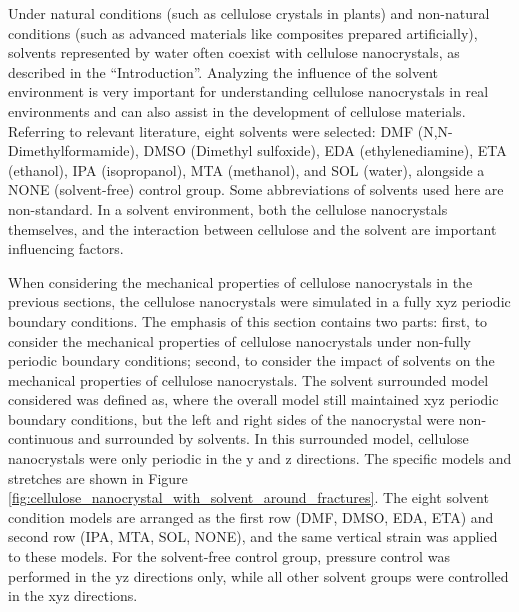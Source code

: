 \documentclass{article}
\begin{document}
Under natural conditions (such as cellulose crystals in plants) and non-natural conditions (such as advanced materials like composites prepared artificially), solvents represented by water often coexist with cellulose nanocrystals, as described in the ``Introduction''.
Analyzing the influence of the solvent environment is very important for understanding cellulose nanocrystals in real environments and can also assist in the development of cellulose materials.
Referring to relevant literature, eight solvents were selected: DMF (N,N-Dimethylformamide)\cite{bui2022synthesis}, DMSO (Dimethyl sulfoxide)\cite{dong2024preparation}, EDA (ethylenediamine)\cite{li2024mild}, ETA (ethanol)\cite{yang2025evaluating}, IPA (isopropanol)\cite{yeo2022robust}, MTA (methanol)\cite{przybylek2023use}, and SOL (water)\cite{etale2023cellulose}, alongside a NONE (solvent-free) control group.
Some abbreviations of solvents used here are non-standard.
In a solvent environment, both the cellulose nanocrystals themselves, and the interaction between cellulose and the solvent are important influencing factors.

When considering the mechanical properties of cellulose nanocrystals in the previous sections, the cellulose nanocrystals were simulated in a fully xyz periodic boundary conditions.
The emphasis of this section contains two parts: first, to consider the mechanical properties of cellulose nanocrystals under non-fully periodic boundary conditions; second, to consider the impact of solvents on the mechanical properties of cellulose nanocrystals.
The solvent surrounded model considered was defined as, where the overall model still maintained xyz periodic boundary conditions, but the left and right sides of the nanocrystal were non-continuous and surrounded by solvents.
In this surrounded model, cellulose nanocrystals were only periodic in the y and z directions.
The specific models and stretches are shown in Figure \ref{fig:cellulose_nanocrystal_with_solvent_around_fractures}.
The eight solvent condition models are arranged as the first row (DMF, DMSO, EDA, ETA) and second row (IPA, MTA, SOL, NONE), and the same vertical strain was applied to these models.
For the solvent-free control group, pressure control was performed in the yz directions only, while all other solvent groups were controlled in the xyz directions.
\end{document}
